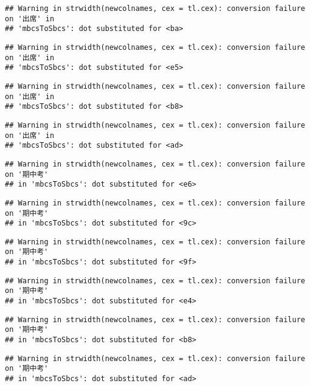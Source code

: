 \documentclass[
]{book}
\begin{document}
\begin{verbatim}
## Warning in strwidth(newcolnames, cex = tl.cex): conversion failure on '出席' in
## 'mbcsToSbcs': dot substituted for <ba>
\end{verbatim}

\begin{verbatim}
## Warning in strwidth(newcolnames, cex = tl.cex): conversion failure on '出席' in
## 'mbcsToSbcs': dot substituted for <e5>
\end{verbatim}

\begin{verbatim}
## Warning in strwidth(newcolnames, cex = tl.cex): conversion failure on '出席' in
## 'mbcsToSbcs': dot substituted for <b8>
\end{verbatim}

\begin{verbatim}
## Warning in strwidth(newcolnames, cex = tl.cex): conversion failure on '出席' in
## 'mbcsToSbcs': dot substituted for <ad>
\end{verbatim}

\begin{verbatim}
## Warning in strwidth(newcolnames, cex = tl.cex): conversion failure on '期中考'
## in 'mbcsToSbcs': dot substituted for <e6>
\end{verbatim}

\begin{verbatim}
## Warning in strwidth(newcolnames, cex = tl.cex): conversion failure on '期中考'
## in 'mbcsToSbcs': dot substituted for <9c>
\end{verbatim}

\begin{verbatim}
## Warning in strwidth(newcolnames, cex = tl.cex): conversion failure on '期中考'
## in 'mbcsToSbcs': dot substituted for <9f>
\end{verbatim}

\begin{verbatim}
## Warning in strwidth(newcolnames, cex = tl.cex): conversion failure on '期中考'
## in 'mbcsToSbcs': dot substituted for <e4>
\end{verbatim}

\begin{verbatim}
## Warning in strwidth(newcolnames, cex = tl.cex): conversion failure on '期中考'
## in 'mbcsToSbcs': dot substituted for <b8>
\end{verbatim}

\begin{verbatim}
## Warning in strwidth(newcolnames, cex = tl.cex): conversion failure on '期中考'
## in 'mbcsToSbcs': dot substituted for <ad>
\end{verbatim}
\end{document}
